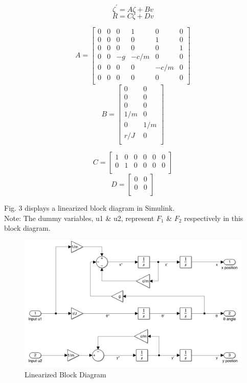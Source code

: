 \documentclass[conference]{IEEEtran}
\begin{document}
\[
\zeta^\prime = A\zeta + Bv
\tag{12}
\] 
\[
R = C\zeta + Dv
\tag{13}
\] 

\[
A = 
\begin{bmatrix}
0&0& 0& 1& 0 &0\\
0 &0 &0 &0 &1 &0\\
0 &0 &0 &0 &0 &1\\
0 &0 &-g& -c/m &0 &0\\
0 &0 &0 &0 &-c/m &0\\
0 &0 &0 &0 &0 &0\\
\end{bmatrix}
\tag{14}
\]
\[
B = 
\begin{bmatrix}
0 &0\\
0 &0\\
0 &0\\
1/m& 0\\
0 &1/m\\
r/J& 0\\
\end{bmatrix}
\tag{15}
\] 

\[
C = 
\begin{bmatrix}
1&0&0&0&0&0\\
0&1&0&0&0&0\\
\end{bmatrix}
\tag{16}
\]
\[
D =
\begin{bmatrix}
0&0\\
0&0\\
\end{bmatrix}
\tag{17}
\] 

Fig. 3 displays a linearized block diagram in Simulink. \\
Note: The dummy variables, u1 \& u2, represent $F_1$ \& $F_2$ respectively in this block diagram. \\

\begin{figure}[htbp!]
\centerline{\includegraphics[scale=0.25]{LinearBlock.png}}
\caption{Linearized Block Diagram}
\label{figure}
\end{figure}
\end{document}
